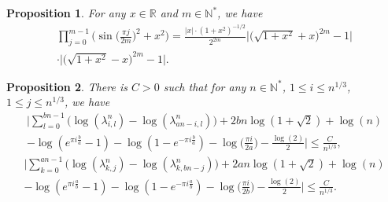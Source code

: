 \documentclass[10pt,a4paper]{amsart}
\newtheorem{prop}{Proposition}
\newcommand{\nat}{\mathbb{N}}
\newcommand{\real}{\mathbb{R}}
\begin{document}
		\begin{prop}\label{prod_prod_sin}
			For any $x \in \real$ and $m \in \nat^*$, we have
			\begin{multline}
				\prod_{j = 0}^{m-1} \Big( \sin \Big( \frac{\pi j }{2m} \Big)^2 + x^2 \Big)
				=
				\frac{|x| 
				\cdot
				(1 + x^2)^{-1/2}}{2^{2m}}
				\Big|
					\big( 
						 \sqrt{1 + x^2} + x
					\big)^{2m}
					-
					1
				\Big|
				\\
				\cdot
				\Big|
					\big( 
						\sqrt{1 + x^2} - x
					\big)^{2m}
					-
					1
				\Big|.
			\end{multline}
		\end{prop}

		\begin{prop}
			There is $C > 0$ such that for any $n \in \nat^*$, $1 \leq i \leq  n^{1/3}$,  $1 \leq j \leq  n^{1/3}$, we have
			\begin{multline}\label{eq_prod_sin_aux_20}
				\bigg|
				\sum_{l = 0}^{bn - 1} 
				\Big( 
				\log(\lambda_{i, l}^{n})
				-
				\log(\lambda_{an-i, l}^{n})
				\Big)
				+
				2bn \log(1 + \sqrt{2})
				+
				\log(n)
				\\
				-
				\log(e^{\pi i \frac{b}{a}} - 1)
				-
				\log(1 - e^{- \pi i \frac{b}{a}})
				-
				\log
				\Big(
					\frac{\pi i}{2a}
				\Big)
				-
				\frac{\log(2)}{2}
				\bigg|
				\leq
				\frac{C}{n^{1/3}},
			\end{multline}
			\vspace*{-0.7cm}
			\begin{multline}\label{eq_prod_sin_aux_2020}
				\bigg|
				\sum_{k = 0}^{an - 1} 
				\Big( 
				\log(\lambda_{k, j}^{n})
				-
				\log(\lambda_{k, bn - j}^{n})
				\Big)
				+
				2an \log(1 + \sqrt{2})
				+
				\log(n)
				\\
				-
				\log(e^{\pi i \frac{a}{b}} - 1)
				-
				\log(1 - e^{- \pi i \frac{a}{b}})
				-
				\log
				\Big(
					\frac{\pi i}{2b}
				\Big)
				-
				\frac{\log(2)}{2}
				\bigg|
				\leq
				\frac{C}{n^{1/3}}.
			\end{multline}
		\end{prop}		 
\end{document}
